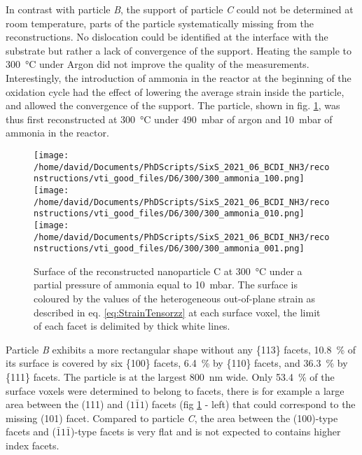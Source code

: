 In contrast with particle \textit{B}, the support of particle \textit{C} could not be determined at room temperature, parts of the particle systematically missing from the reconstructions.
No dislocation could be identified at the interface with the substrate but rather a lack of convergence of the support.
Heating the sample to \qty{300}{\degreeCelsius} under Argon did not improve the quality of the measurements.
Interestingly, the introduction of ammonia in the reactor at the beginning of the oxidation cycle had the effect of lowering the average strain inside the particle, and allowed the convergence of the support.
The particle, shown in fig. \ref{fig:D6Facets}, was thus first reconstructed at \qty{300}{\degreeCelsius} under \qty{490}{\milli\bar} of argon and \qty{10}{\milli\bar} of ammonia in the reactor.

\begin{figure}[!htb]
    \centering
    \texttt{[image: /home/david/Documents/PhDScripts/SixS\_2021\_06\_BCDI\_NH3/reconstructions/vti\_good\_files/D6/300/300\_ammonia\_100.png]}
    \texttt{[image: /home/david/Documents/PhDScripts/SixS\_2021\_06\_BCDI\_NH3/reconstructions/vti\_good\_files/D6/300/300\_ammonia\_010.png]}
    \texttt{[image: /home/david/Documents/PhDScripts/SixS\_2021\_06\_BCDI\_NH3/reconstructions/vti\_good\_files/D6/300/300\_ammonia\_001.png]}
    \caption{
        Surface of the reconstructed nanoparticle C at \qty{300}{\degreeCelsius} under a partial pressure of ammonia equal to \qty{10}{\milli\bar}.
        The surface is coloured by the values of the heterogeneous out-of-plane strain as described in eq. \ref{eq:StrainTensorzz} at each surface voxel, the limit of each facet is delimited by thick white lines.
    }
    \label{fig:D6Facets}
\end{figure}

Particle \textit{B} exhibits a more rectangular shape without any \{113\} facets, \qty{10.8}{\percent} of its surface is covered by six \{100\} facets, \qty{6.4}{\percent} by \{110\} facets, and \qty{36.3}{\percent} by \{111\} facets.
The particle is at the largest \qty{800}{\nm} wide.
Only \qty{53.4}{\percent} of the surface voxels were determined to belong to facets, there is for example a large area between the (111) and ($1\bar{1}1$) facets (fig \ref{fig:D6Facets} - left) that could correspond to the missing (101) facet.
Compared to particle \textit{C}, the area between the (100)-type facets and ($\bar{1}1\bar{1}$)-type facets is very flat and is not expected to contains higher index facets.

